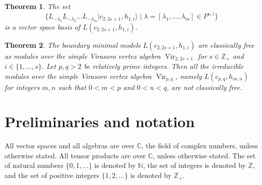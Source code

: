 \documentclass[a4paper, 12pt, reqno]{amsart}
\newtheorem{theorem}{Theorem}[section]
\theoremstyle{remark}
\DeclareMathOperator{\Vir}{Vir}
\begin{document}
\begin{theorem}
  \label{thr:2}
  The set
  \begin{equation*}
    \{L_{-\lambda_1}L_{-\lambda_2}\dots L_{-\lambda_m}|c_{2, 2s + 1}, h_{1, i}\rangle \mid \lambda = [\lambda_1, \dots, \lambda_m] \in P^{s, i}\}
  \end{equation*}
  is a vector space basis of $L(c_{2, 2s + 1}, h_{1, i})$.
\end{theorem}

\begin{theorem}
  \label{thr:3}
  The boundary minimal models $L(c_{2, 2s + 1}, h_{1, i})$ are classically free as modules over the simple Virasoro vertex algebra $\Vir_{2, 2s + 1}$ for $s \in \mathbb{Z}_+$ and $i \in \{1, \dots, s\}$.
  Let $p, q > 2$ be relatively prime integers.
  Then all the irreducible modules over the simple Virasoro vertex algebra $\Vir_{p, q}$, namely $L(c_{p, q}, h_{m, n})$ for integers $m, n$ such that $0 < m < p$ and $0 < n < q$, are not classically free.
\end{theorem}

\section{Preliminaries and notation}
\label{sec:prel-notat}

All vector spaces and all algebras are over $\mathbb{C}$, the field of complex numbers, unless otherwise stated.
All tensor products are over $\mathbb{C}$, unless otherwise stated.
The set of natural numbers $\{0, 1, \dots\}$ is denoted by $\mathbb{N}$, the set of integers is denoted by $\mathbb{Z}$, and the set of positive integers $\{1, 2, \dots\}$ is denoted by $\mathbb{Z}_+$.
\end{document}
